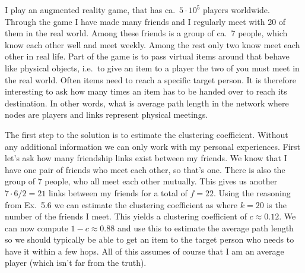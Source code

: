 
I play an augmented reality game, that has ca.~$5\cdot{}10^5$ players worldwide. Through the game I have made many friends and I regularly meet with 20 of them in the real world. Among these friends is a group of ca.~7 people, which know each other well and meet weekly. Among the rest only two know meet each other in real life. Part of the game is to pass virtual items around that behave like physical objects, i.e.~to give an item to a player the two of you must meet in the real world. Often items need to reach a specific target person. It is therefore interesting to ask how many times an item has to be handed over to reach its destination. In other words, what is average path length in the network where nodes are players and links represent physical meetings.     

\solution
The first step to the solution is to estimate the clustering coefficient. Without any additional information we can only work with my personal experiences. First let's ask how many friendship links exist between my friends. We know that I have one pair of friends who meet each other, so that's one. There is also the group of 7 people, who all meet each other mutually. This gives us another $7\cdot{}6/2=21$ links between my friends for a total of $f=22$. 
Using the reasoning from Ex.~5.6 we can estimate the clustering coefficient as 
where $k=20$ is the number of the friends I meet. This yields a clustering coefficient of $c\approx 0.12$.
 We can now compute $1-c\approx 0.88$ and use this to estimate the average path length
so we should typically be able to get an item to the target person who needs to have it within a few hops. All of this assumes of course that I am an average player (which isn't far from the truth). 
